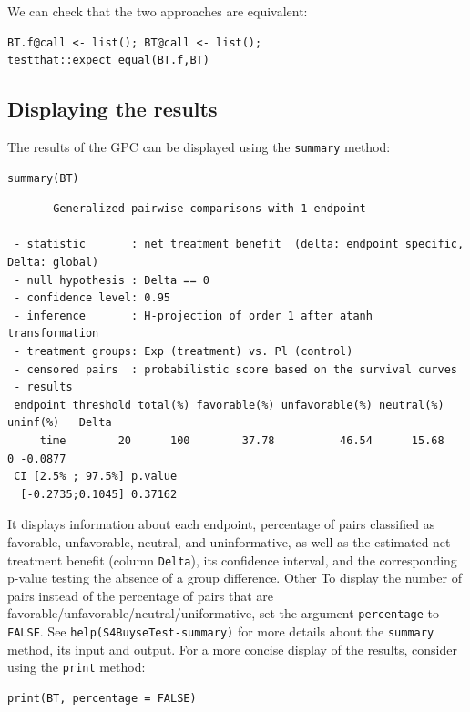 \documentclass[12pt]{article}
\begin{document}
We can check that the two approaches are equivalent:
\lstset{language=r,label= ,caption= ,captionpos=b,numbers=none}
\begin{lstlisting}
BT.f@call <- list(); BT@call <- list();
testthat::expect_equal(BT.f,BT)
\end{lstlisting}

\subsection{Displaying the results}
\label{sec:org720e748}

The results of the GPC can be displayed using the \texttt{summary} method:
\lstset{language=r,label= ,caption= ,captionpos=b,numbers=none}
\begin{lstlisting}
summary(BT)
\end{lstlisting}

\begin{verbatim}
       Generalized pairwise comparisons with 1 endpoint

 - statistic       : net treatment benefit  (delta: endpoint specific, Delta: global) 
 - null hypothesis : Delta == 0 
 - confidence level: 0.95 
 - inference       : H-projection of order 1 after atanh transformation 
 - treatment groups: Exp (treatment) vs. Pl (control) 
 - censored pairs  : probabilistic score based on the survival curves
 - results
 endpoint threshold total(%) favorable(%) unfavorable(%) neutral(%) uninf(%)   Delta
     time        20      100        37.78          46.54      15.68        0 -0.0877
 CI [2.5% ; 97.5%] p.value 
  [-0.2735;0.1045] 0.37162
\end{verbatim}


It displays information about each endpoint, percentage of pairs
classified as favorable, unfavorable, neutral, and uninformative, as
well as the estimated net treatment benefit (column \texttt{Delta}), its confidence
interval, and the corresponding p-value testing the absence of a group
difference. Other To display the number of pairs instead of the
percentage of pairs that are
favorable/unfavorable/neutral/uniformative, set the argument
\texttt{percentage} to \texttt{FALSE}. See \texttt{help(S4BuyseTest-summary)} for more
details about the \texttt{summary} method, its input and output. For a more
concise display of the results, consider using the \texttt{print} method:
\lstset{language=r,label= ,caption= ,captionpos=b,numbers=none}
\begin{lstlisting}
print(BT, percentage = FALSE)
\end{lstlisting}
\end{document}

